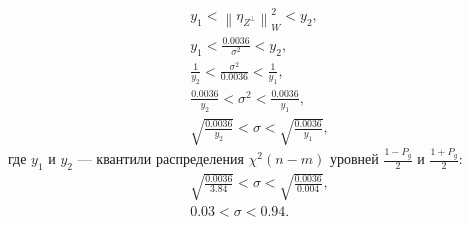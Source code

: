 \documentclass[a4paper,12pt]{article}
\newcommand{\norm}[1]{\left \| #1 \right \|}
\newcommand{\pro}[2]{#1_{#2^\perp}}
\begin{document}
\begin{enumerate}
          \begin{gather*}
              y_1 < \norm{\pro{\eta}{Z}}_W^2 < y_2 , \\
              y_1 < \frac{0.0036}{\sigma^2} < y_2 , \\
              \frac{1}{y_2} < \frac{\sigma^2}{0.0036} < \frac{1}{y_1} , \\
              \frac{0.0036}{y_2} < \sigma^2 < \frac{0.0036}{y_1} , \\
              \sqrt{\frac{0.0036}{y_2}} < \sigma < \sqrt{\frac{0.0036}{y_1}} ,
          \end{gather*}
          где $y_1$ и $y_2$ --- квантили распределения $\chi^2(n-m)$ уровней $\frac{1-P_g}{2}$ и $\frac{1+P_g}{2}$:
          \begin{gather*}
              \sqrt{\frac{0.0036}{3.84}} < \sigma < \sqrt{\frac{0.0036}{0.004}} , \\
              0.03 < \sigma < 0.94 .
          \end{gather*}


\end{enumerate}
\end{document}
